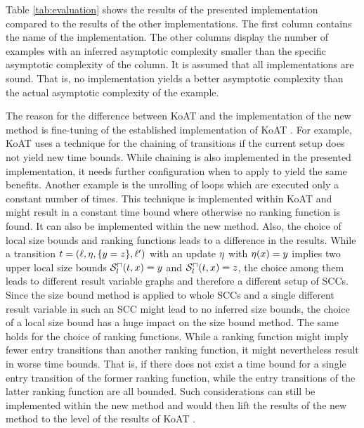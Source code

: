 Table \ref{tab:evaluation} shows the results of the presented implementation compared to the results of the other implementations.
The first column contains the name of the implementation.
The other columns display the number of examples with an inferred asymptotic complexity smaller than the specific asymptotic complexity of the column.
It is assumed that all implementations are sound.
That is, no implementation yields a better asymptotic complexity than the actual asymptotic complexity of the example.

The reason for the difference between KoAT \cite{koat} and the implementation of the new method is fine-tuning of the established implementation of KoAT \cite{koat}.
For example, KoAT \cite{koat} uses a technique for the chaining of transitions if the current setup does not yield new time bounds.
While chaining is also implemented in the presented implementation, it needs further configuration when to apply to yield the same benefits.
Another example is the unrolling of loops which are executed only a constant number of times.
This technique is implemented within KoAT \cite{koat} and might result in a constant time bound where otherwise no ranking function is found.
It can also be implemented within the new method.
Also, the choice of local size bounds and ranking functions leads to a difference in the results.
While a transition $t = (\ell, \eta, \lbrace y=z \rbrace, \ell')$ with an update $\eta$ with $\eta(x)=y$ implies two upper local size bounds ${\mathcal{S}^\sqcap_l}(t,x)=y$ and ${\mathcal{S}^\sqcap_l}(t,x)=z$, the choice among them leads to different result variable graphs and therefore a different setup of SCCs.
Since the size bound method is applied to whole SCCs and a single different result variable in such an SCC might lead to no inferred size bounds, the choice of a local size bound has a huge impact on the size bound method.
The same holds for the choice of ranking functions.
While a ranking function might imply fewer entry transitions than another ranking function, it might nevertheless result in worse time bounds.
That is, if there does not exist a time bound for a single entry transition of the former ranking function, while the entry transitions of the latter ranking function are all bounded.
Such considerations can still be implemented within the new method and would then lift the results of the new method to the level of the results of KoAT \cite{koat}.
